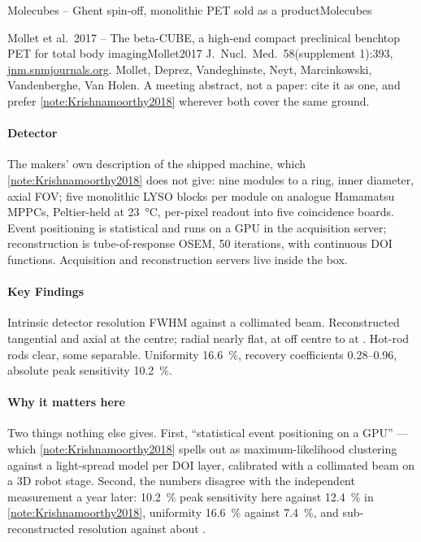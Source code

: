 \begin{programnote}{Molecubes -- Ghent spin-off, monolithic PET sold as a product}{Molecubes}
\begin{papernote}{Mollet et al.\ 2017 -- The beta-CUBE, a high-end compact preclinical benchtop PET for total body imaging}{Mollet2017}
J.\ Nucl.\ Med.\ 58(supplement 1):393,
\href{https://jnm.snmjournals.org/content/58/supplement_1/393}{jnm.snmjournals.org}.
Mollet, Deprez, Vandeghinste, Neyt,
Marcinkowski, Vandenberghe, Van Holen. A meeting abstract, not a paper: cite
it as one, and prefer \ref{note:Krishnamoorthy2018} wherever both cover the same
ground.

\paragraph{Detector}
The makers' own description of the shipped machine, which
\ref{note:Krishnamoorthy2018} does not give: nine modules to a ring,  inner
diameter,  axial FOV; five 
monolithic LYSO blocks per module on analogue Hamamatsu MPPCs, Peltier-held at
\qty{23}{\celsius}, per-pixel readout into five coincidence boards. Event
positioning is statistical and runs on a GPU in the acquisition server;
reconstruction is tube-of-response OSEM, 50 iterations, with continuous DOI
functions. Acquisition and reconstruction servers live inside the
 box.

\paragraph{Key Findings}
Intrinsic detector resolution  FWHM against a  collimated
beam. Reconstructed  tangential and  axial at the centre;
radial nearly flat,  at  off centre to  at .
Hot-rod  rods clear, some  separable. Uniformity
\qty{16.6}{\percent}, recovery coefficients \numrange{0.28}{0.96}, absolute
peak sensitivity \qty{10.2}{\percent}.

\paragraph{Why it matters here}
Two things nothing else gives. First, ``statistical event positioning on a
GPU'' --- which \ref{note:Krishnamoorthy2018} spells out as maximum-likelihood
clustering against a light-spread model per DOI layer, calibrated with a
 collimated beam on a 3D robot stage.
Second, the numbers disagree with the independent measurement a year later:
\qty{10.2}{\percent} peak sensitivity here against
\qty{12.4}{\percent} in \ref{note:Krishnamoorthy2018}, uniformity
\qty{16.6}{\percent} against \qty{7.4}{\percent}, and sub-
reconstructed resolution against about .


\end{papernote}
\end{programnote}
